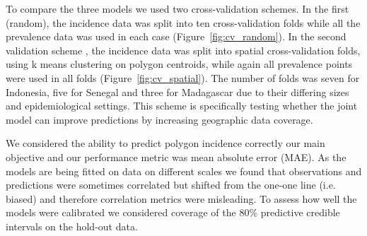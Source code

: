 \documentclass{statsoc}
\begin{document}
To compare the three models we used two cross-validation schemes. 
In the first (random), the incidence data was split into ten cross-validation folds while all the prevalence data was used in each case (Figure~\ref{fig:cv_random}). 
In the second validation scheme , the incidence data was split into spatial cross-validation folds, using k means clustering on polygon centroids, while again all prevalence points were used in all folds (Figure~\ref{fig:cv_spatial}).
The number of folds was seven for Indonesia, five for Senegal and three for Madagascar due to their differing sizes and epidemiological settings.
This scheme is specifically testing whether the joint model can improve predictions by increasing geographic data coverage.


We considered the ability to predict polygon incidence correctly our main objective and our performance metric was mean absolute error (MAE).
As the models are being fitted on data on different scales we found that observations and predictions were sometimes correlated but shifted from the one-one line (i.e. biased) and therefore correlation metrics were misleading.
To assess how well the models were calibrated we considered coverage of the 80\% predictive credible intervals on the hold-out data.



\begin{table}
\caption{\label{table1}
Summary of out-of-sample accuracy for all three cross-validation experiments. 
Mean absolute error of predicted incidence rate against out-of-sample observed data for three countries.}
\centering
{}
\end{table}
\end{document}
